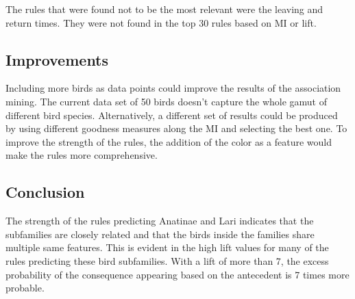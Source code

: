 The rules that were found not to be the most relevant were the leaving and return times. They were not found in the top 30 rules based on MI or lift.

\subsection{Improvements}
Including more birds as data points could improve the results of the association mining. The current data set of 50 birds doesn't capture the whole gamut of different bird species. Alternatively, a different set of results could be produced by using different goodness measures along the MI and selecting the best one. To improve the strength of the rules, the addition of the color as a feature would make the rules more comprehensive.

\subsection{Conclusion}

The strength of the rules predicting Anatinae and Lari indicates that the subfamilies are closely related and that the birds inside the families share multiple same features. This is evident in the high lift values for many of the rules predicting these bird subfamilies. With a lift of more than 7, the excess probability of the consequence appearing based on the antecedent is 7 times more probable.



